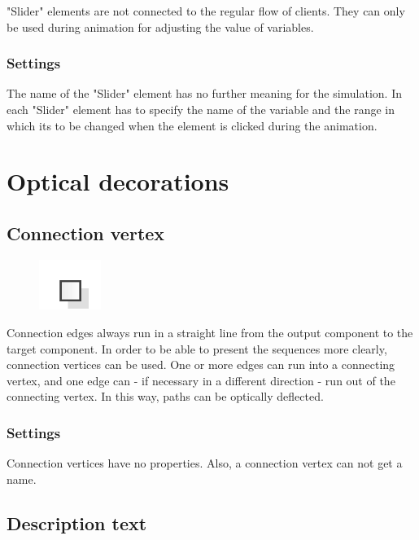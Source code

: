 "Slider" elements are not connected to the regular flow of clients.
They can only be used during animation for adjusting the value of
variables.

\subsection*{Settings}

The name of the "Slider" element has no further meaning for the simulation.
In each "Slider" element has to specify the name of the variable and the
range in which its to be changed when the element is clicked during the
animation.





\chapter{Optical decorations}

\section{Connection vertex}
\label{ref:ModelElementVertex}

\begin{figure}
\vspace{-22pt}
\includegraphics[width=2cm]{imageModelElementVertex.png}
\vspace{-22pt}
\end{figure}

Connection edges always run in a straight line from the output component
to the target component. In order to be able to present the sequences more clearly, connection vertices can be used.
One or more edges can run into a connecting vertex, and one edge can - if necessary in a different direction - run out
of the connecting vertex. In this way, paths can be optically deflected.

\subsection*{Settings}

Connection vertices have no properties. Also, a connection vertex can not get a name.


\section{Description text}
\label{ref:ModelElementText}

